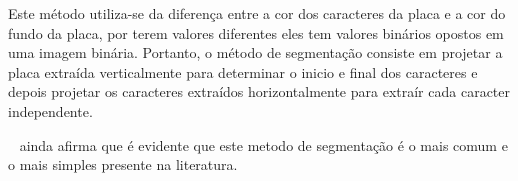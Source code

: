 Este método utiliza-se da diferença entre a cor dos caracteres da placa e a cor do fundo da placa, por terem valores diferentes 
eles tem valores binários opostos em uma imagem binária. Portanto, o método de segmentação consiste em projetar a placa extraída 
verticalmente para determinar o inicio e final dos caracteres e depois projetar os caracteres extraídos horizontalmente para extraír 
cada caracter independente.

~\cite{s2013automatic} ainda afirma que é evidente que este metodo de segmentação é o mais comum e o mais simples presente na 
literatura.

